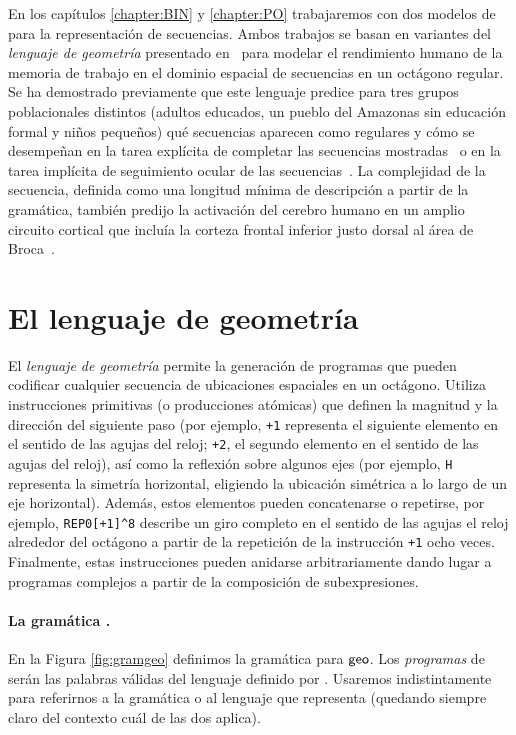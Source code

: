 
En los capítulos \ref{chapter:BIN} y \ref{chapter:PO} trabajaremos con dos modelos de \lot para la representación de secuencias. Ambos trabajos se basan en variantes del \textit{lenguaje de geometría} presentado en~\cite{amalric2017language} para modelar el rendimiento humano de la memoria de trabajo en el dominio espacial de secuencias en un octágono regular. Se ha demostrado previamente que este lenguaje predice para tres grupos poblacionales distintos (adultos educados, un pueblo del Amazonas sin educación formal y niños pequeños) qué secuencias aparecen como regulares y cómo se desempeñan en la tarea explícita de completar las secuencias mostradas~\cite{amalric2017language} o en la tarea implícita de seguimiento ocular de las secuencias~\cite{f60}. La complejidad de la secuencia, definida como una longitud mínima de descripción a partir de la gramática, también predijo la activación del cerebro humano en un amplio circuito cortical que incluía la corteza frontal inferior justo dorsal al área de Broca~\cite{f60}.

\section*{El lenguaje de geometría \gramgeo}

El \textit{lenguaje de geometría} permite la generación de programas que pueden codificar cualquier secuencia de ubicaciones espaciales en un octágono. Utiliza instrucciones primitivas (o producciones atómicas) que definen la magnitud y la dirección del siguiente paso (por ejemplo, \verb#+1# representa el siguiente elemento en el sentido de las agujas del reloj; \verb#+2#, el segundo elemento en el sentido de las agujas del reloj), así como la reflexión sobre algunos ejes (por ejemplo, \verb#H# representa la simetría horizontal, eligiendo la ubicación simétrica a lo largo de un eje horizontal). Además, estos elementos pueden concatenarse o repetirse, por ejemplo, \verb#REP0[+1]^8# describe un giro completo en el sentido de las agujas el reloj alrededor del octágono a partir de la repetición de la instrucción \verb#+1# ocho veces. Finalmente, estas instrucciones pueden anidarse arbitrariamente dando lugar a programas complejos a partir de la composición de subexpresiones.

\paragraph{La gramática \gramgeo.}
En la Figura \ref{fig:gramgeo} definimos la gramática para ${\sf geo}$. Los {\em programas} de \gramgeo serán las palabras válidas del lenguaje definido por \gramgeo. Usaremos indistintamente \gramgeo para referirnos a la gramática o al lenguaje que representa (quedando siempre claro del contexto cuál de las dos aplica).

